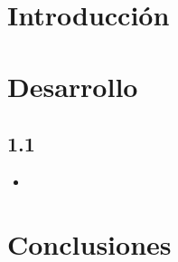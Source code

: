 \documentclass[11.5pt]{article}
\begin{document}
\pagestyle{fancyplain}
\fancyhf{}
\rhead{ \fancyplain{}{\the\year} }
\rfoot{ \fancyplain{}{\thepage} }
\renewcommand{\footrulewidth}{0.5pt}

\begin{center}
\tableofcontents
\end{center}

\begin{center}
\listoffigures
\end{center}

\clearpage

\newpage

\section{Introducción}







\section{Desarrollo}

\subsection{1.1}
    \begin{itemize}
        \item 
    \end{itemize}
    




\section{Conclusiones}


    
    




    
\end{document}
